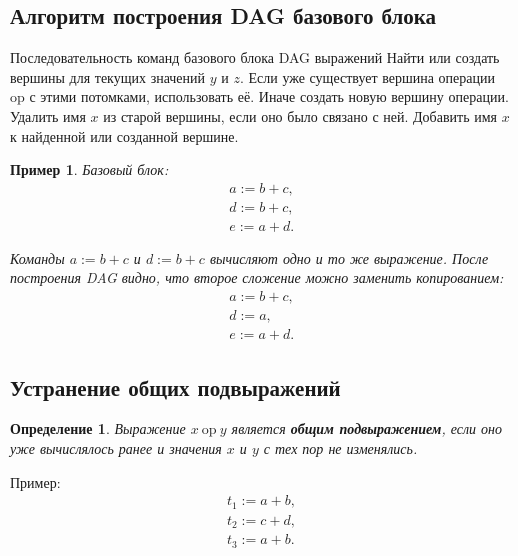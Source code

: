 \documentclass[12pt,a4paper]{article}
\newtheorem{definition}{Определение}
\newtheorem{example}{Пример}
\begin{document}
\subsection{Алгоритм построения DAG базового блока}

\begin{algorithm}[H]
\caption{Построение DAG для базового блока}
\begin{algorithmic}[1]
\Require Последовательность команд базового блока
\Ensure DAG выражений
    \State Найти или создать вершины для текущих значений $y$ и $z$.
    \State Если уже существует вершина операции $\mathrm{op}$ с этими потомками, использовать её.
    \State Иначе создать новую вершину операции.
    \State Удалить имя $x$ из старой вершины, если оно было связано с ней.
    \State Добавить имя $x$ к найденной или созданной вершине.
\EndFor
\end{algorithmic}
\end{algorithm}

\begin{example}
Базовый блок:
\[
\begin{array}{l}
a := b + c,\\
d := b + c,\\
e := a + d.
\end{array}
\]

Команды $a := b+c$ и $d := b+c$ вычисляют одно и то же выражение. После построения DAG видно, что второе сложение можно заменить копированием:
\[
\begin{array}{l}
a := b + c,\\
d := a,\\
e := a + d.
\end{array}
\]
\end{example}

\subsection{Устранение общих подвыражений}

\begin{definition}
Выражение $x \ \mathrm{op}\ y$ является \textbf{общим подвыражением}, если оно уже вычислялось ранее и значения $x$ и $y$ с тех пор не изменялись.
\end{definition}

Пример:
\[
\begin{array}{l}
t_1 := a + b,\\
t_2 := c + d,\\
t_3 := a + b.
\end{array}
\]
\end{document}
